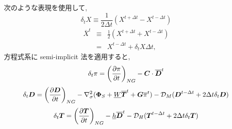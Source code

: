 次のような表現を使用して,
%
\begin{equation}
  \label{せみいんぷ}
  \delta_{t} {X} \equiv \frac{1}{2 \Delta t} 
        \left( {X}^{t+\Delta t} - {X}^{t-\Delta t} \right)
\end{equation}
%
\begin{eqnarray}
    \overline{X}^{t}
  & \equiv & \frac{1}{2} \left( {X}^{t+\Delta t} 
                              + {X}^{t-\Delta t} \right)
        \nonumber \\ 
  & = & {X}^{t-\Delta t} + \delta_{t} {X} \Delta t   ,
\end{eqnarray}
%
方程式系に semi-implicit 法を適用すると,
%
\begin{equation}
  \label{semi-imp pi}
  \delta_{t} \pi =
          \left( \frac{\partial \pi}{\partial t} \right)_{NG}  
     - \Dvect{C} \cdot \overline{ \Dvect{D} }^{t}
\end{equation}
%
\begin{equation}
  \label{semi-imp D}
  \delta_{t} \Dvect{D} =
          \left( \frac{\partial \Dvect{D}}{\partial t} \right)_{NG}  
          - \nabla^{2}_{\sigma} ( \Dvect{\Phi}_{S} 
                                  + \underline{W} 
                                     \overline{ \Dvect{T} }^{t}
                                  + \Dvect{G}
                                  \overline{\pi}^{t} ) 
          - {\cal D}_M ( \Dvect{D}^{t-\Delta t} 
                         + 2 \Delta t \delta_{t} \Dvect{D} )
\end{equation}
%
\begin{equation}
  \label{semi-imp T}
  \delta_{t} \Dvect{T} =
        \left( \frac{\partial \Dvect{T}}{\partial t} \right)_{NG}  
         - \underline{h} \overline{ \Dvect{D} }^{t} 
         - {\cal D}_H ( \Dvect{T}^{t-\Delta t}
                        + 2 \Delta t \delta_{t} \Dvect{T} )
\end{equation}


